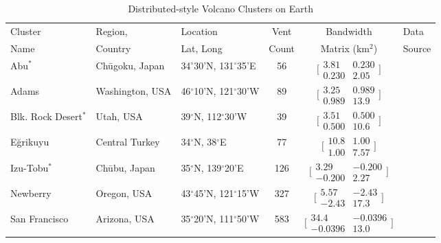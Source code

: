 \begin{table}[t!]
\centering
\caption{Distributed-style Volcano Clusters on Earth}
\begin{tabular}{p{2cm} p{2.5cm} p{2cm} c c p{4cm}}
\toprule
Cluster	&	Region, &	Location	&	Vent &	Bandwidth	&	Data\\
Name		& Country	&	Lat, Long	&	Count	&	Matrix (km$^2$)	&Source\\
\midrule
Abu$^*$		&	Ch\={u}goku, Japan	&	34$^{\circ}$30'N, 131$^{\circ}$35'E	&	56	&	$\bigl[\begin{smallmatrix} 3.81&0.230\\0.230&2.05 \end{smallmatrix}\bigr]$	&	\citet{kiyosugi2012relationship,kiyosugi2010relationships}\\
Adams		&	Washington, USA	&	46$^{\circ}$10'N, 121$^{\circ}$30'W	&	89	&	$\bigl[\begin{smallmatrix} 3.25&0.989\\0.989&13.9 \end{smallmatrix}\bigr]$	&	\citet{barron2014database}\\
Blk. Rock Desert$^*$ &	Utah, USA		&	39$^{\circ}$N, 112$^{\circ}$30'W&	39	&	$\bigl[\begin{smallmatrix} 3.51&0.500\\0.500&10.6 \end{smallmatrix}\bigr]$	&	\citet{kiyosugi2012relationship,hintz2008physical}\\
E\u{g}rikuyu	&	Central Turkey	&	34$^{\circ}$N, 38$^{\circ}$E	&	77	&	$\bigl[\begin{smallmatrix} 10.8&1.00\\1.00&7.57 \end{smallmatrix}\bigr]$	&	\citet{uslular2015size}\\
Izu-Tobu$^*$	&	Ch\={u}bu, Japan	&	35$^{\circ}$N, 139$^{\circ}$20'E	&	126	&	$\bigl[\begin{smallmatrix} 3.29&-0.200\\-0.200&2.27 \end{smallmatrix}\bigr]$	&	\citet{kiyosugi2012relationship}\\
Newberry	&	Oregon, USA	&	43$^{\circ}$45'N, 121$^{\circ}$15'W	&	327	&	$\bigl[\begin{smallmatrix} 5.57&-2.43\\-2.43&17.3 \end{smallmatrix}\bigr]$	&	\citet{bard2013database}\\
San \mbox{Francisco}	&	Arizona, USA	&	35$^{\circ}$20'N, 111$^{\circ}$50'W	&	583	&	$\bigl[\begin{smallmatrix} 34.4&-0.0396\\-0.0396&13.0 \end{smallmatrix}\bigr]$	&	\citet{harburger2014probabilistic}\\

\end{tabular}
\end{table}

